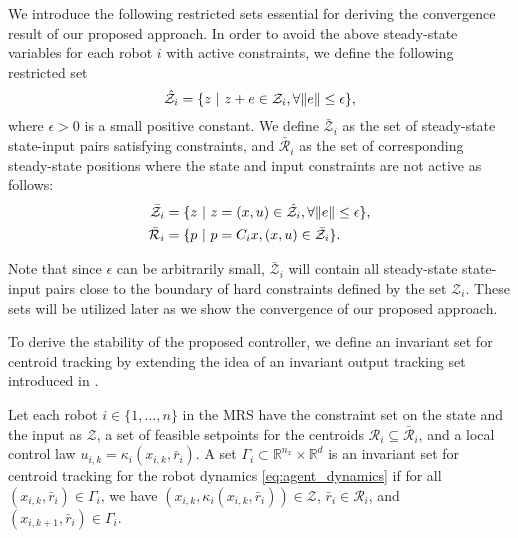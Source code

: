 We introduce the following restricted sets essential for deriving the convergence result of our proposed approach. In order to avoid the above steady-state variables for each robot $i$ with active constraints, we define the following restricted set
\begin{equation}
    \hat{\mathcal{Z}_i} = \{ z \ | \ z + e \in \mathcal{Z}_i, \forall \lVert e\rVert \leq \epsilon \}, 
\end{equation}
where $\epsilon>0$ is a small positive constant. We define $\bar{\mathcal{Z}}_i$ as the set of steady-state state-input pairs satisfying constraints, and $\bar{\mathcal{R}}_i$ as the set of corresponding steady-state positions where the state and input constraints are not active as follows:
\begin{align}
    \bar{\mathcal{Z}}_i &= \{z \ | \ z = (x,u) \in \hat{\mathcal{Z}_i}, \forall \lVert e\rVert \leq \epsilon \}, \\
    \bar{\mathcal{R}}_i &= \{p \ | \ p = C_ix, (x,u) \in \bar{\mathcal{Z}}_i\}.
\end{align}

Note that since $\epsilon$ can be arbitrarily small, $\bar{\mathcal{Z}}_i$ will contain all steady-state state-input pairs close to the boundary of hard constraints defined by the set $\mathcal{Z}_i$. These sets will be utilized later as we show the convergence of our proposed approach.

To derive the stability of the proposed controller, we define an invariant set for centroid tracking by extending the idea of an invariant output tracking set introduced in \cite{limon2018nonlinear, limon2008mpc}.
\begin{definition}
Let each robot $i\in \{1,\dots, n\}$ in the MRS have the constraint set on the state and the input as $\mathcal{Z}$, a set of feasible setpoints for the centroids $\mathcal{R}_i \subseteq \bar{\mathcal{R}}_i$, and a local control law $u_{i,k} = \kappa_i(x_{i,k}, \bar{r}_i)$. A set $\Gamma_i \subset \mathbb{R}^{n_x} \times \mathbb{R}^{d}$ is an invariant set for centroid tracking for the robot dynamics \eqref{eq:agent_dynamics} if for all $(x_{i,k}, \bar{r}_i) \in \Gamma_i$, we have $(x_{i,k}, \kappa_i(x_{i,k}, \bar{r}_i)) \in \mathcal{Z}$, $\bar{r}_i \in \mathcal{R}_i$, and $(x_{i,k+1}, \bar{r}_i) \in \Gamma_i$.
\end{definition}


